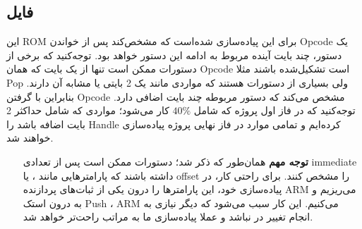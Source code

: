 \subsection*{
	فایل
	}
این ROM برای این پیاده‌سازی شده‌است که مشخص‌کند پس از
خواندن Opcode یک دستور، چند بایت آینده مربوط به ادامه این دستور خواهد بود. توجه‌کنید که برخی از دستورات ممکن است تنها از یک بایت که همان Opcode است تشکیل‌شده باشند مثلا Pop ولی بسیاری از دستورات هستند که مواردی مانند یک 
2 بایتی یا مشابه آن دارند. بنابراین
با گرفتن
Opcode مشخص
می‌کند که دستور مربوطه چند بایت اضافی دارد. توجه‌کنید که در فاز اول پروژه که شامل 
$40 \%$
کار می‌شود؛ مواردی که شامل حداکثر 2 بایت اضافه باشد را Handle کرده‌ایم و تمامی موارد در فاز نهایی پروژه پیاده‌سازی خواهند شد.
\begin{itemize}
	\item[
	\danger\textbf{توجه مهم}
	]
	همان‌طور که ذکر شد؛ دستورات ممکن است پس از 
	تعدادی immediate داشته باشند که پارامترهایی مانند
	،
	یا offset را مشخص کنند. برای راحتی کار، در پیاده‌سازی خود، این پارامترها را درون یکی از ثبات‌های پردازنده ARM می‌ریزیم و به درون استک Push ، ARM می‌کنیم. این کار سبب می‌شود که دیگر نیازی به انجام تغییر در
	نباشد و عملا پیاده‌سازی ما به مراتب راحت‌تر خواهد شد.
\end{itemize}